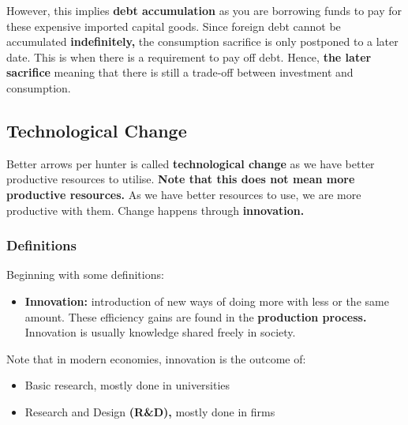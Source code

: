 \documentclass[12pt, letterpaper]{article}
\begin{document}
However, this implies \textbf{debt accumulation} as you are borrowing funds to pay for these expensive imported capital goods. Since foreign debt cannot be accumulated \textbf{indefinitely,} the consumption sacrifice is only postponed to a later date. This is when there is a requirement to pay off debt. Hence, \textbf{the later sacrifice} meaning that there is still a trade-off between investment and consumption.

\subsection{Technological Change}
Better arrows per hunter is called \textbf{technological change} as we have better productive resources to utilise. \textbf{Note that this does not mean more productive resources.} As we have better resources to use, we are more productive with them. Change happens through \textbf{innovation.}

\subsubsection{Definitions}
Beginning with some definitions:
\begin{itemize}
	\item \textbf{Innovation:} introduction of new ways of doing more with less or the same amount. These efficiency gains are found in the \textbf{production process.} Innovation is usually knowledge shared freely in society.
\end{itemize}

Note that in modern economies, innovation is the outcome of:
\begin{itemize}
	\item Basic research, mostly done in universities
	\item Research and Design \textbf{(R\&D),} mostly done in firms
\end{itemize}
\end{document}
